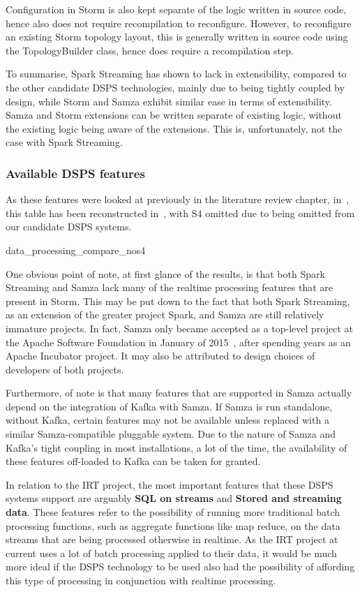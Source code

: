 Configuration in Storm is also kept separate of the logic written in source code, hence also does not require recompilation
to reconfigure. However, to reconfigure an existing Storm topology layout, this is generally written in source code using
the TopologyBuilder class, hence does require a recompilation step.

To summarise, Spark Streaming has shown to lack in extensibility, compared to the other candidate DSPS technologies, mainly
due to being tightly coupled by design, while Storm and Samza exhibit similar ease in terms of extensibility. Samza and
Storm extensions can be written separate of existing logic, without the existing logic being aware of the extensions.
This is, unfortunately, not the case with Spark Streaming.


\subsubsection{Available DSPS features}

As these features were looked at previously in the literature review chapter, in~,
this table has been reconstructed in~, with S4 omitted due to being omitted from our candidate
DSPS systems.

{data_processing_compare_nos4}

One obvious point of note, at first glance of the results, is that both Spark Streaming and Samza lack many of the realtime processing
features that are present in Storm. This may be put down to the fact that both Spark Streaming, as an extension
of the greater project Spark, and Samza are still relatively immature projects. In fact, Samza only became accepted as a
top-level project at the Apache Software Foundation in January of 2015~\cite{web:apache-top-samza}, after spending years
as an Apache Incubator project. It may also be attributed to design choices of developers of both projects.

Furthermore, of note is that many features that are supported in Samza actually depend on the integration of Kafka with
Samza. If Samza is run standalone, without Kafka, certain features may not be available unless replaced with a similar
Samza-compatible pluggable system. Due to the nature of Samza and Kafka's tight coupling in most installations, a lot
of the time, the availability of these features off-loaded to Kafka can be taken for granted.

In relation to the IRT project, the most important features that these DSPS systems support are arguably \textbf{SQL on
streams} and \textbf{Stored and streaming data}. These features refer to the possibility of running more traditional
batch processing functions, such as aggregate functions like map reduce, on the data streams that are being processed
otherwise in realtime. As the IRT project at current uses a lot of batch processing applied to their data, it would be
much more ideal if the DSPS technology to be used also had the possibility of affording this type of processing in
conjunction with realtime processing.

